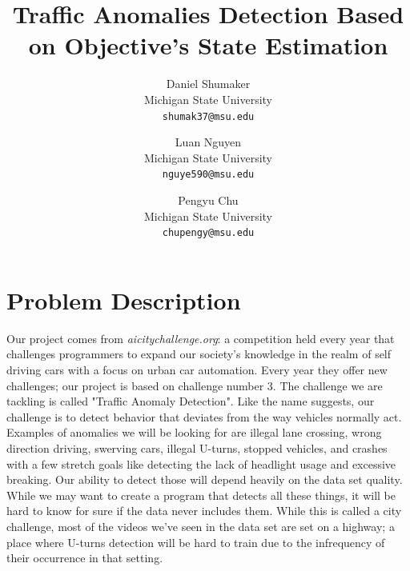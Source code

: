 \documentclass[10pt,twocolumn,letterpaper]{article}
\begin{document}
\title{Traffic Anomalies Detection Based on Objective's State Estimation}
\author{
Daniel Shumaker\\
Michigan State University\\
{\tt\small shumak37@msu.edu}
\and
Luan Nguyen\\
Michigan State University\\
{\tt\small nguye590@msu.edu}
\and
Pengyu Chu\\
Michigan State University\\
{\tt\small chupengy@msu.edu}
}

\maketitle


\section{Problem Description}
    
Our project comes from \textit{aicitychallenge.org}: a competition held every year that challenges programmers to expand our society's knowledge in the realm of self driving cars with a focus on urban car automation. Every year they offer new challenges; our project is based on challenge number 3. The challenge we are tackling is called "Traffic Anomaly Detection". Like the name suggests, our challenge is to detect behavior that deviates from the way vehicles normally act. Examples of anomalies we will be looking for are illegal lane crossing, wrong direction driving, swerving cars, illegal U-turns, stopped vehicles, and crashes with a few stretch goals like detecting the lack of headlight usage and excessive breaking. Our ability to detect those will depend heavily on the data set quality. While we may want to create a program that detects all these things, it will be hard to know for sure if the data never includes them. While this is called a city challenge, most of the videos we've seen in the data set are set on a highway; a place where U-turns detection will be hard to train due to the infrequency of their occurrence in that setting.
\end{document}
